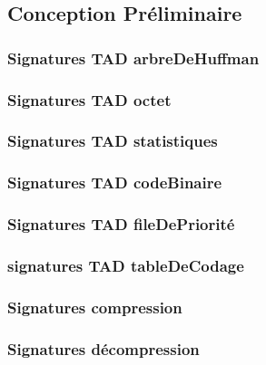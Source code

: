 \subsection{Conception Préliminaire}

\subsubsection{Signatures TAD arbreDeHuffman}


\subsubsection{Signatures TAD octet}


\subsubsection{Signatures TAD statistiques}


\subsubsection{Signatures TAD codeBinaire}


\subsubsection{Signatures TAD fileDePriorité}


\subsubsection{signatures TAD tableDeCodage}


\subsubsection{Signatures compression}


\subsubsection{Signatures décompression}

